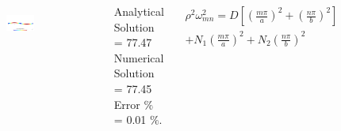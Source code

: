 \documentclass[9pt]{beamer}
\begin{document}
\begin{frame}
\begin{columns}
\begin{figure}[h!]
\begin{subfigure}{1\textwidth}
\end{subfigure}\vfill
\begin{subfigure}{1\textwidth}
\includegraphics[width=\linewidth,trim={0 8cm 0 8cm},clip]{NAS277_pos_3.png}
\end{subfigure}

\end{figure}

Analytical Solution = 77.47 \\
Numerical Solution =  77.45\\
Error $\%$ = 0.01 $\%$.


\begin{equation*}
\begin{split}
\rho^2 \omega_{mn}^2=   D  \left[ \left( \frac{m\pi}{a} \right)^2 + \left( \frac{n\pi}{b} \right)^2 \right]\\ + N_1 \left( \frac{m\pi}{a} \right)^2 +N_2 \left( \frac{n\pi}{b} \right)^2 
\end{split}
\end{equation*}






\end{columns}
\end{frame}
\end{document}
